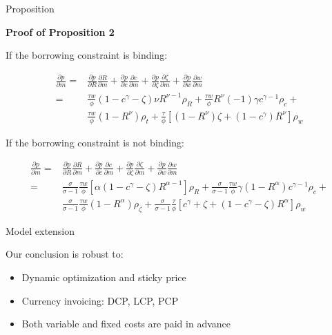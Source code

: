 \documentclass[10pt]{beamer}
\begin{document}
\begin{frame}{Proposition}

\textbf{Proof of Proposition 2}

If the borrowing constraint is binding:

\begin{align*} 
\frac{\partial p}{\partial m} =&\frac{\partial p}{\partial R}\frac{\partial R}{\partial m}+\frac{\partial p}{\partial c}\frac{\partial c}{\partial m}+\frac{\partial p}{\partial \zeta}\frac{\partial \zeta}{\partial m}+\frac{\partial p}{\partial w}\frac{\partial w}{\partial m}  \\
=& \frac{\tau w}{\phi}(1-c^\gamma-\zeta)\nu R^{\nu-1} \rho_R+ \frac{\tau w}{\phi} R^\nu(-1)\gamma c^{\gamma-1} \rho_c +\\  
& \frac{\tau w}{\phi}(1-R^\nu) \rho_t+\frac{\tau}{\phi}[(1-R^\nu)\zeta+(1-c^\gamma)R^\nu] \rho_w
\end{align*} 

If the borrowing constraint is not binding:

\begin{align*} 
\frac{\partial p}{\partial m} =&\frac{\partial p}{\partial R}\frac{\partial R}{\partial m}+\frac{\partial p}{\partial c}\frac{\partial c}{\partial m}+\frac{\partial p}{\partial \zeta}\frac{\partial \zeta}{\partial m}+\frac{\partial p}{\partial w}\frac{\partial w}{\partial m}  \\
=& \frac{\sigma}{\sigma-1}\frac{\tau w}{\phi}[\alpha(1-c^\gamma-\zeta)R^{\alpha-1}] \rho_R + \frac{\sigma}{\sigma-1}\frac{\tau w}{\phi}\gamma(1-R^\alpha)c^{\gamma-1} \rho_c + \\
& \frac{\sigma}{\sigma-1}\frac{\tau w}{\phi} (1-R^\alpha) \rho_\zeta + \frac{\sigma}{\sigma-1}\frac{\tau}{\phi}[c^\gamma+\zeta+(1-c^\gamma-\zeta)R^\alpha] \rho_w
\end{align*} 

\end{frame}



\begin{frame}[label=model_extension]{Model extension}
\fontsize{13}{13}\selectfont

Our conclusion is robust to:
\medskip
\medskip

\begin{itemize}
    \item Dynamic optimization and sticky price
    \medskip
    \item Currency invoicing: DCP, LCP, PCP
    \medskip
    \item Both variable and fixed costs are paid in advance
\end{itemize}

\hyperlink{appendix_model_extension}{}

\end{frame}
\end{document}
